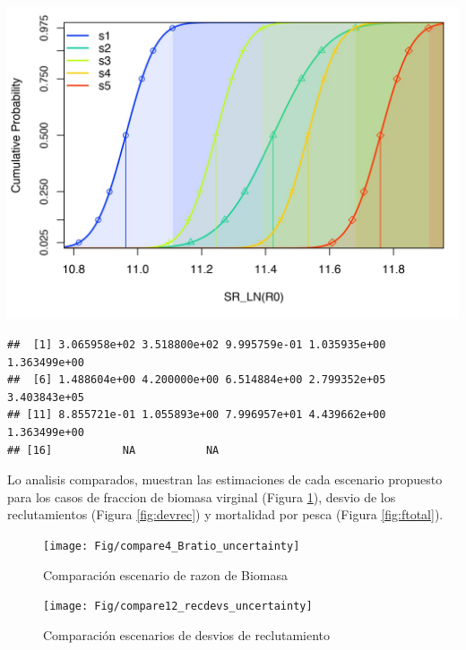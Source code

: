 \documentclass[
]{article}
\begin{document}
\begin{center}\includegraphics{Dtrunculus_SS3_2024_files/figure-latex/unnamed-chunk-17-20} \end{center}

\begin{verbatim}
##  [1] 3.065958e+02 3.518800e+02 9.995759e-01 1.035935e+00 1.363499e+00
##  [6] 1.488604e+00 4.200000e+00 6.514884e+00 2.799352e+05 3.403843e+05
## [11] 8.855721e-01 1.055893e+00 7.996957e+01 4.439662e+00 1.363499e+00
## [16]           NA           NA
\end{verbatim}

Lo analisis comparados, muestran las estimaciones de cada escenario propuesto para los casos de fraccion de biomasa virginal (Figura \ref{fig:biov}), desvio de los reclutamientos (Figura \ref{fig:devrec}) y mortalidad por pesca (Figura \ref{fig:ftotal}).

\begin{figure}[H]

{\centering \texttt{[image: Fig/compare4\_Bratio\_uncertainty]} 

}

\caption{\label{fig:biov}Comparación escenario de razon de Biomasa}\label{fig:biov}
\end{figure}

\begin{figure}[H]

{\centering \texttt{[image: Fig/compare12\_recdevs\_uncertainty]} 

}

\caption{\label{fig:devrec}Comparación escenarios de desvios de reclutamiento}\label{fig:debrec}
\end{figure}
\end{document}
